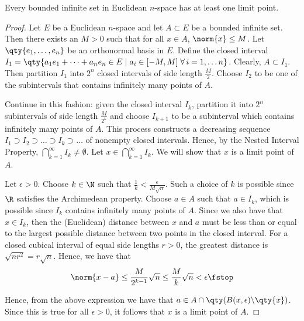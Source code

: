 \begin{proposition}
  \label{thm:boundedlim}
  Every bounded infinite set in Euclidean \( n \)-space has at least one limit point.
\end{proposition}
\begin{proof}
  Let \( E \) be a Euclidean \( n \)-space and let \( A\subset E \) be a bounded infinite set. Then there exists an \( M>0 \) such that for all \( x\in A \), \( \norm{x}\leq M \). Let \( \qty{e_1,\dots,e_n} \) be an orthonormal basis in \( E \). Define the closed interval \( I_1=\qty{a_1e_1+\dots+a_ne_n\in E\mid a_i\in[-M,M]\; \forall\, i=1,\dots n} \). Clearly, \( A\subset I_1 \). Then partition \( I_1 \) into \( 2^n \) closed intervals of side length \( \frac{M}{2} \). Choose \( I_2 \) to be one of the subintervals that contains infinitely many points of \( A \).

  \vspace{3mm}

  Continue in this fashion: given the closed interval \( I_k \), partition it into \( 2^n \) subintervals of side length \( \frac{M}{2^{k}} \) and choose \( I_{k+1} \) to be a subinterval which contains infinitely many points of \( A \). This process constructs a decreasing sequence \( I_1\supset I_2\supset\dots\supset I_k\supset\dots \) of nonempty closed intervals. Hence, by the Nested Interval Property, \( \bigcap_{k=1}^\infty I_k\neq\emptyset \). Let \( x\in\bigcap_{k=1}^\infty I_k \). We will show that \( x \) is a limit point of \( A \).

  \vspace{3mm}

  Let \( \epsilon>0 \). Choose \( k\in\N \) such that \( \frac{1}{k}<\frac{\epsilon}{M\sqrt{n}} \). Such a choice of \( k \) is possible since \( \R \) satisfies the Archimedean property. Choose \( a\in A \) such that \( a\in I_k \), which is possible since \( I_k \) contains infinitely many points of \( A \). Since we also have that \( x\in I_k \), then the (Euclidean) distance between \( x \) and \( a \) must be less than or equal to the largest possible distance between two points in the closed interval. For a closed cubical interval of equal side lengths \( r>0 \), the greatest distance is \( \sqrt{nr^2}=r\sqrt{n} \). Hence, we have that
  \[ \norm{x-a}\leq\frac{M}{2^{k-1}}\sqrt{n}\leq\frac{M}{k}\sqrt{n}<\epsilon\fstop \]
  
  Hence, from the above expression we have that \( a\in A\cap\qty(B(x,\epsilon)\backslash\qty{x}) \). Since this is true for all \( \epsilon>0 \), it follows that \( x \) is a limit point of \( A \).
\end{proof}

